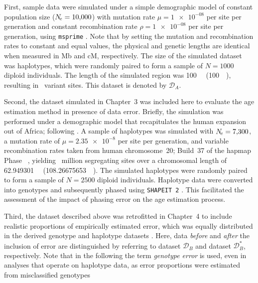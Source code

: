 First, sample data were simulated under a simple demographic model of constant population size (${N_{\!e} = \num{10000}}$) with mutation rate ${\mu=\num[round-precision=1]{1e-08}}$ per site per generation and constant recombination rate ${\rho=\num[round-precision=1]{1e-08}}$ per site per generation, using \texttt{msprime} \citep{Kelleher:2016fn}.
Note that by setting the mutation and recombination rates to constant and equal values, the physical and genetic lengths are identical when measured in \gls{Mb} and \gls{cM}, respectively.
The size of the simulated dataset was  haplotypes, which were randomly paired to form a sample of ${N=\num{1000}}$ diploid individuals.
The length of the simulated region was \SI{100}{\mega\basepair} (\SI{100}{\centi\morgan}), resulting in ~variant sites.
This dataset is denoted by $\mathcal{D}_A$.

Second, the dataset simulated in Chapter~3 was included here to evaluate the age estimation method in presence of data error.
Briefly, the simulation was performed under a demographic model that recapitulates the human expansion out of Africa; following \citet{Gutenkunst:2009gs}.
A sample of  haplotypes was simulated with ${N_{\!e}=\num{7300}}$, a mutation rate of ${\mu=\num[round-precision=2]{2.35e-8}}$ per site per generation, and variable recombination rates taken from human chromosome~20; Build~37 of the \gls{hapmap} Phase~ \citep{Frazer:2007kha, InternationalHapMapConsortium:2010en}, yielding ~million segregating sites over a chromosomal length of \SI{62.949301}{\mega\basepair} (\SI{108.26675653}{\centi\morgan}).
The simulated haplotypes were randomly paired to form a sample of ${N=\num{2500}}$ diploid individuals.
Haplotype data were converted into genotypes and subsequently phased using \texttt{SHAPEIT\,2} \citep{Delaneau:2008dk,Delaneau:2013hi}.
This facilitated the assessment of the impact of phasing error on the age estimation process.

Third, the dataset described above was retrofitted in Chapter~4 to include realistic proportions of empirically estimated error, which was equally distributed in the derived genotype and haplotype datasets .
Here, data \emph{before} and \emph{after} the inclusion of error are distinguished by referring to dataset $\mathcal{D}_B$ and dataset $\mathcal{D}_B^{\ast}$, respectively.
Note that in the following the term \emph{genotype error} is used, even in analyses that operate on haplotype data, as error proportions were estimated from misclassified genotypes 


